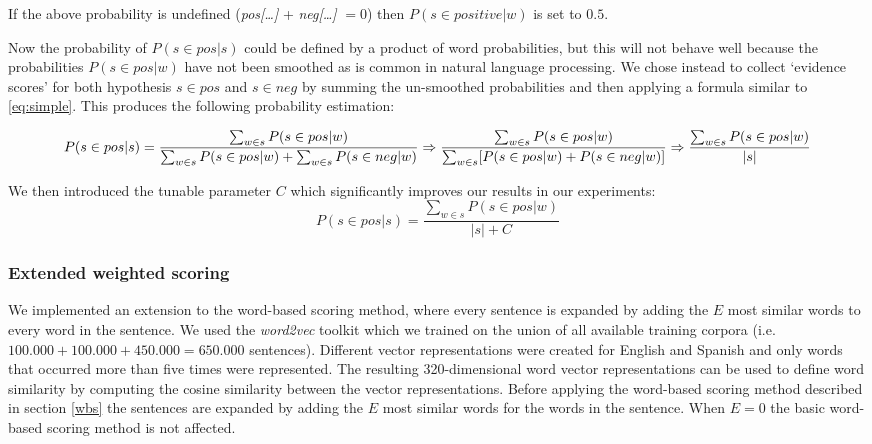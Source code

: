 \documentclass[11pt]{article}
\begin{document}
If the above probability is undefined (\textit{pos[\dots]} + \textit{neg[\dots]} $= 0$) then $P(s\in positive | w)$ is set to $0.5$.

Now the probability of $P(s\in pos | s)$ could be defined by a product of word probabilities, but this will not behave well because the probabilities $P(s\in pos | w)$ have not been smoothed as is common in natural language processing. We chose instead to collect `evidence scores' for both hypothesis $s\in pos$ and $s\in neg$ by summing the un-smoothed probabilities and then applying a formula similar to \ref{eq:simple}. This produces the following probability estimation:

\begin{dmath} 
P(s\in pos | s)  = \\\\ 
\frac{\sum_{w\in s} P(s\in pos | w)}{\sum_{w\in s} P(s\in pos | w) + \sum_{w\in s} P(s\in neg | w)} \Rightarrow \\\\\\  
\frac{\sum_{w\in s} P(s\in pos | w)}{\sum_{w\in s} [ P(s\in pos | w) + P(s\in neg | w) ]} \Rightarrow \\\\\\ 
\frac{\sum_{w\in s} P(s\in pos | w)}{ | s | } 
\end{dmath}

We then introduced the tunable parameter $C$ which significantly improves our results in our experiments:
\begin{equation} P(s\in pos | s)  = \frac{\sum_{w\in s} P(s\in pos | w)}{ | s | + C}  \end{equation}



\subsubsection{Extended weighted scoring}
We implemented an extension to the word-based scoring method, where every sentence is expanded by adding the $E$ most similar words to every word in the sentence. We used the \textit{word2vec} toolkit \cite{word2vec} which we trained on the union of all available training corpora (i.e. $100.000 + 100.000 + 450.000 = 650.000$ sentences). Different vector representations were created for English and Spanish and only words that occurred more than five times were represented. The resulting 320-dimensional word vector representations can be used to define word similarity by computing the cosine similarity between the vector representations. 
Before applying the word-based scoring method described in section \ref{wbs} the sentences are expanded by adding the $E$ most similar words for the words in the sentence. When $E=0$ the basic word-based scoring method is not affected.
\end{document}
